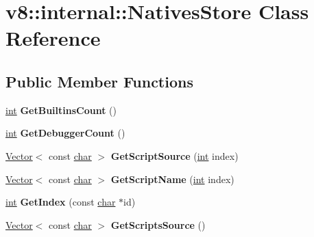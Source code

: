 \hypertarget{classv8_1_1internal_1_1NativesStore}{}\section{v8\+:\+:internal\+:\+:Natives\+Store Class Reference}
\label{classv8_1_1internal_1_1NativesStore}
\subsection*{Public Member Functions}
\begin{DoxyCompactItemize}
\item 
\mbox{\label{classv8_1_1internal_1_1NativesStore_aa83dd7318798926fe7e06e933e9d10a3}} 
\mbox{\hyperlink{classint}{int}} {\bfseries Get\+Builtins\+Count} ()
\item 
\mbox{\label{classv8_1_1internal_1_1NativesStore_ac287c2edbd1fe89ef5754426c159bbfa}} 
\mbox{\hyperlink{classint}{int}} {\bfseries Get\+Debugger\+Count} ()
\item 
\mbox{\label{classv8_1_1internal_1_1NativesStore_a091b840bae3d0c80b95d05d3db7acd82}} 
\mbox{\hyperlink{classv8_1_1internal_1_1Vector}{Vector}}$<$ const \mbox{\hyperlink{classchar}{char}} $>$ {\bfseries Get\+Script\+Source} (\mbox{\hyperlink{classint}{int}} index)
\item 
\mbox{\label{classv8_1_1internal_1_1NativesStore_a1bf5870025d691e06e95e87b0df35277}} 
\mbox{\hyperlink{classv8_1_1internal_1_1Vector}{Vector}}$<$ const \mbox{\hyperlink{classchar}{char}} $>$ {\bfseries Get\+Script\+Name} (\mbox{\hyperlink{classint}{int}} index)
\item 
\mbox{\label{classv8_1_1internal_1_1NativesStore_a8c17f3c2d1ff5028c4387cf91c4cad75}} 
\mbox{\hyperlink{classint}{int}} {\bfseries Get\+Index} (const \mbox{\hyperlink{classchar}{char}} $\ast$id)
\item 
\mbox{\label{classv8_1_1internal_1_1NativesStore_a2dd14f8739e2eed27dde73c7a792c4bb}} 
\mbox{\hyperlink{classv8_1_1internal_1_1Vector}{Vector}}$<$ const \mbox{\hyperlink{classchar}{char}} $>$ {\bfseries Get\+Scripts\+Source} ()
\end{DoxyCompactItemize}
